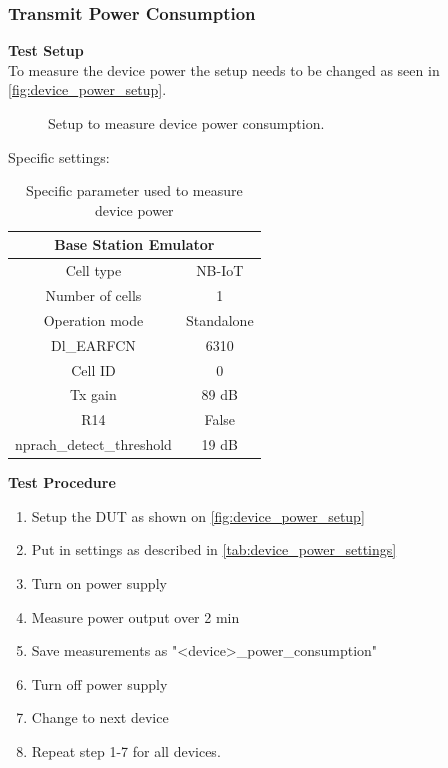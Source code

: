 \subsubsection{Transmit Power Consumption}
\textbf{Test Setup}\\
To measure the device power the setup needs to be changed as seen in \autoref{fig:device_power_setup}.
\begin{figure}[H]
\centering
{}
\caption{Setup to measure device power consumption.}
\label{fig:device_power_setup}
\end{figure}

Specific settings:
\begin{table}[H]
\centering
\begin{tabular}{|c|c|} \hline
\multicolumn{2}{|c|}{\textbf{Base Station Emulator}} \\ \hline
Cell type          & NB-IoT         \\ \hline
Number of cells    & 1              \\ \hline
Operation mode     & Standalone     \\ \hline
Dl\_EARFCN         & 6310           \\ \hline
Cell ID            & 0              \\ \hline
Tx gain            & 89 dB          \\ \hline
R14                & False          \\ \hline
nprach\_detect\_threshold  & 19 dB  \\ \hline
\end{tabular}
\caption{Specific parameter used to measure device power}
\label{tab:device_power_settings}
\end{table}


\textbf{Test Procedure}\\
\begin{enumerate}
\item Setup the \gls{DUT} as shown on \autoref{fig:device_power_setup}
\item Put in settings as described in \autoref{tab:device_power_settings} 
\item Turn on power supply 
\item Measure power output over 2 min
\item Save measurements as "<device>\_power\_consumption"
\item Turn off power supply
\item Change to next device
\item Repeat step 1-7 for all devices.
\end{enumerate}

